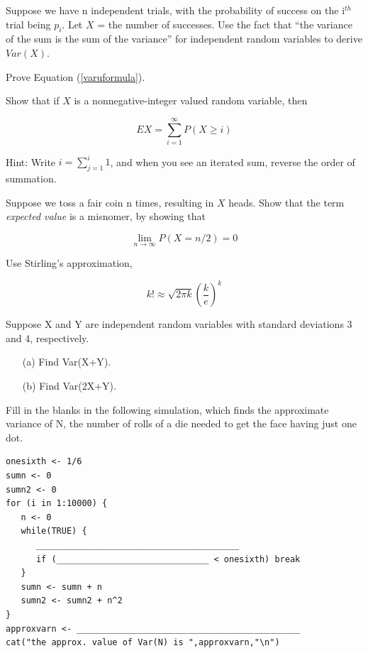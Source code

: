 \oneproblem
Suppose we have n independent trials, with the probability
of success on the i$^{th}$ trial being $p_i$.  Let $X$ = the number of
successes.  Use the fact that ``the variance of the sum is the sum of
the variance'' for independent random variables to derive $Var(X)$.

\oneproblem
Prove Equation (\ref{varuformula}).

\oneproblem
Show that if $X$ is a nonnegative-integer valued random variable, then

\begin{equation}
EX = \sum_{i=1}^{\infty} P(X \geq i)
\end{equation}

Hint:  Write $i = \sum_{j=1}^i 1$, and when you see an iterated sum,
reverse the order of summation.

\oneproblem
Suppose we toss a fair coin n times, resulting in $X$ heads.  Show that
the term {\it expected value} is a misnomer, by showing that

\begin{equation}
\lim_{n \rightarrow \infty} P(X = n/2) = 0
\end{equation}

Use Stirling's approximation, 

\begin{equation}
k! \approx \sqrt{2 \pi k} \left ( \frac{k}{e} \right )^k
\end{equation}

\oneproblem
Suppose X and Y are independent random variables with standard
deviations 3 and 4, respectively.

\begin{itemize}

\item [(a)] Find Var(X+Y).

\item [(b)] Find Var(2X+Y).

\end{itemize}

\oneproblem
Fill in the blanks in the following simulation, which finds
the approximate variance of N, the number of rolls of a die needed to
get the face having just one dot.

\begin{Verbatim}[fontsize=\relsize{-2}]
onesixth <- 1/6
sumn <- 0
sumn2 <- 0
for (i in 1:10000) {
   n <- 0
   while(TRUE) {
      ________________________________________
      if (______________________________ < onesixth) break
   }
   sumn <- sumn + n
   sumn2 <- sumn2 + n^2
}
approxvarn <- ____________________________________________
cat("the approx. value of Var(N) is ",approxvarn,"\n")
\end{Verbatim}

